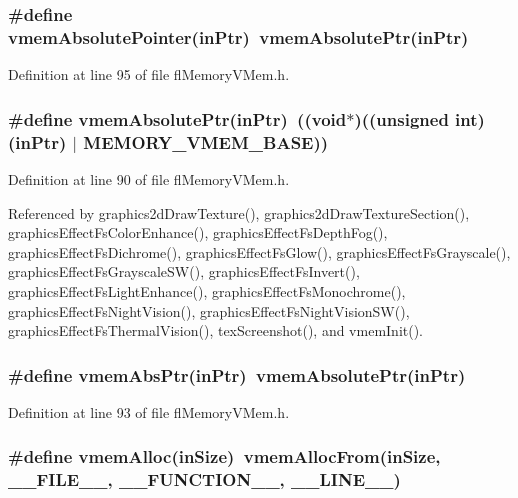 \subsubsection{\setlength{\rightskip}{0pt plus 5cm}\#define vmem\-Absolute\-Pointer(in\-Ptr)~vmem\-Absolute\-Ptr(in\-Ptr)}\label{flMemoryVMem_8h_edc894e4bc2f35ebc1cb0751375f48ee}




Definition at line 95 of file fl\-Memory\-VMem.h.
\subsubsection{\setlength{\rightskip}{0pt plus 5cm}\#define vmem\-Absolute\-Ptr(in\-Ptr)~((void$\ast$)((unsigned int)(in\-Ptr) $|$ MEMORY\_\-VMEM\_\-BASE))}\label{flMemoryVMem_8h_7b78b1a9e7e0025f9da99899aa782298}




Definition at line 90 of file fl\-Memory\-VMem.h.

Referenced by graphics2d\-Draw\-Texture(), graphics2d\-Draw\-Texture\-Section(), graphics\-Effect\-Fs\-Color\-Enhance(), graphics\-Effect\-Fs\-Depth\-Fog(), graphics\-Effect\-Fs\-Dichrome(), graphics\-Effect\-Fs\-Glow(), graphics\-Effect\-Fs\-Grayscale(), graphics\-Effect\-Fs\-Grayscale\-SW(), graphics\-Effect\-Fs\-Invert(), graphics\-Effect\-Fs\-Light\-Enhance(), graphics\-Effect\-Fs\-Monochrome(), graphics\-Effect\-Fs\-Night\-Vision(), graphics\-Effect\-Fs\-Night\-Vision\-SW(), graphics\-Effect\-Fs\-Thermal\-Vision(), tex\-Screenshot(), and vmem\-Init().
\subsubsection{\setlength{\rightskip}{0pt plus 5cm}\#define vmem\-Abs\-Ptr(in\-Ptr)~vmem\-Absolute\-Ptr(in\-Ptr)}\label{flMemoryVMem_8h_1349d2983e8548e73b5a46d0e9253cc6}




Definition at line 93 of file fl\-Memory\-VMem.h.
\subsubsection{\setlength{\rightskip}{0pt plus 5cm}\#define vmem\-Alloc(in\-Size)~vmem\-Alloc\-From(in\-Size, \_\-\_\-FILE\_\-\_\-, \_\-\_\-FUNCTION\_\-\_\-, \_\-\_\-LINE\_\-\_\-)}\label{flMemoryVMem_8h_fe528defdc4064c33e97273936dc149d}





